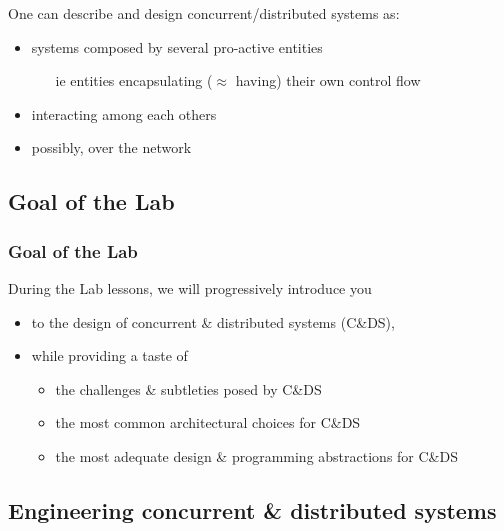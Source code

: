 \documentclass[handout]{beamer}\mode<presentation>{\usetheme{AMSCesenaPurpleAndGold}}
\begin{document}
\begin{frame}[allowframebreaks]
	One can describe and design concurrent/distributed systems as:
	\begin{itemize}
		\item systems composed by several \alert{pro-active} entities
		\begin{itemize}
			\item[ie] entities \alert{encapsulating} ($\approx$ having) their own \alert{control flow}
		\end{itemize}
		\item \alert{interacting} among each others
		\item possibly, over the \alert{network}
	\end{itemize}

\end{frame}

\subsection{Goal of the Lab}

\begin{frame}
	\frametitle{Goal of the Lab}

	During the Lab lessons, we will progressively introduce you
	\vfill
	\begin{itemize}
		\item to the \alert{design} of concurrent \& distributed systems (C\&DS),

		\vfill

		\item while providing a taste of
		\begin{itemize}
			\item the challenges \& subtleties posed by C\&DS
			\item the most common architectural choices for C\&DS
			\item the most adequate design \& programming abstractions for C\&DS
		\end{itemize}

	\end{itemize}

\end{frame}

\subsection{Engineering concurrent \& distributed systems}
\end{document}
